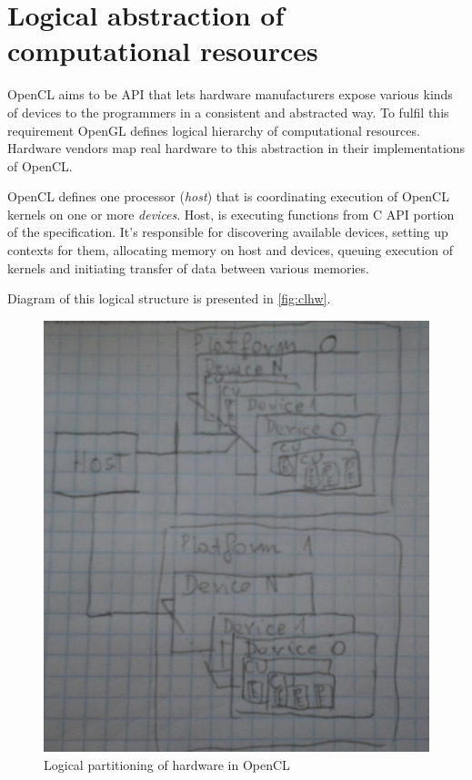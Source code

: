 \section{Logical abstraction of computational resources}
\label{sec:cllogicalabstraction}
OpenCL aims to be API that lets hardware manufacturers expose various kinds of
devices to the programmers in a consistent and abstracted way. To fulfil this
requirement OpenGL defines logical hierarchy of computational resources.
Hardware vendors map real hardware to this abstraction in their implementations
of OpenCL.

OpenCL defines one processor (\emph{host}) that is coordinating execution of
OpenCL kernels on one or more \emph{devices}. Host, is executing functions from
C API portion of the specification. It's responsible for discovering available
devices, setting up contexts for them, allocating memory on host and devices,
queuing execution of kernels and initiating transfer of data between various
memories.

Diagram of this logical structure is presented in \autoref{fig:clhw}.

\begin{figure}[h]
	\begin{center}
		\includegraphics[scale=0.7]{chapters/opencl/opencl_hwmodel.jpg}
	\end{center}
	\caption{Logical partitioning of hardware in OpenCL}
	\label{fig:clhw}
\end{figure}

